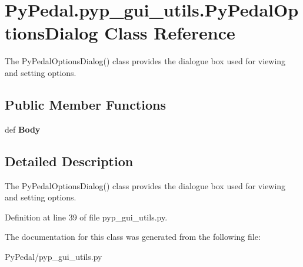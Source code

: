 \hypertarget{classPyPedal_1_1pyp__gui__utils_1_1PyPedalOptionsDialog}{
\section{PyPedal.pyp\_\-gui\_\-utils.PyPedalOptionsDialog Class Reference}
\label{classPyPedal_1_1pyp__gui__utils_1_1PyPedalOptionsDialog}
}


The PyPedalOptionsDialog() class provides the dialogue box used for viewing and setting options.  


\subsection*{Public Member Functions}
\begin{DoxyCompactItemize}
\item 
\hypertarget{classPyPedal_1_1pyp__gui__utils_1_1PyPedalOptionsDialog_aa77b1d9fbe370704c47fe2034e23b153}{
def {\bfseries Body}}
\label{classPyPedal_1_1pyp__gui__utils_1_1PyPedalOptionsDialog_aa77b1d9fbe370704c47fe2034e23b153}

\end{DoxyCompactItemize}


\subsection{Detailed Description}
The PyPedalOptionsDialog() class provides the dialogue box used for viewing and setting options. 

Definition at line 39 of file pyp\_\-gui\_\-utils.py.



The documentation for this class was generated from the following file:\begin{DoxyCompactItemize}
\item 
PyPedal/pyp\_\-gui\_\-utils.py\end{DoxyCompactItemize}
